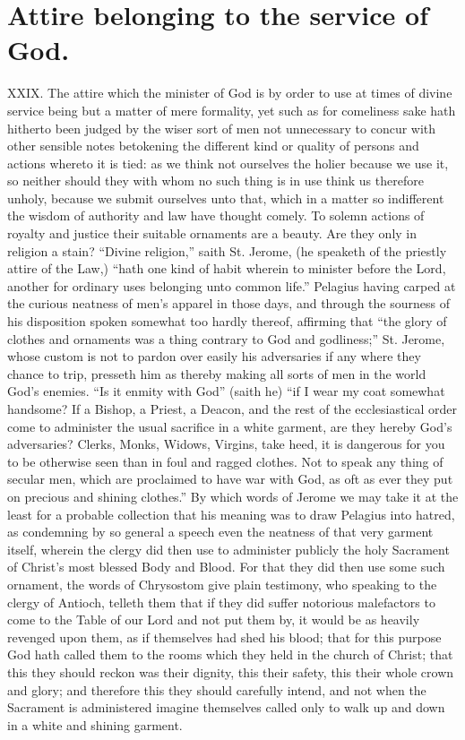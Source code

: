 \section*{Attire belonging to the service of God.}
XXIX. The attire which the minister of God is by order to use at times of divine service being but a matter of mere formality, yet such as for comeliness sake hath hitherto been judged by the wiser sort of men not unnecessary to concur with other sensible notes betokening the different kind or quality of persons and actions whereto it is tied: as we think not ourselves the holier because we use it, so neither should they with whom no such thing is in use think us therefore unholy, because we submit ourselves unto that, which in a matter so  indifferent the wisdom of authority and law have thought comely. To solemn actions of royalty and justice their suitable ornaments are a beauty. Are they only in religion a stain?
“Divine religion,” saith St. Jerome, (he speaketh of the priestly attire of the Law,) “hath one kind of habit wherein to minister before the Lord, another for ordinary uses belonging unto common life.” Pelagius having carped at the curious neatness of men’s apparel in those days, and through the sourness of his disposition spoken somewhat too hardly thereof, affirming that “the glory of clothes and ornaments was a thing contrary to God and godliness;” St. Jerome, whose custom is not to pardon over easily his adversaries if any where they chance to trip, presseth him as thereby making all sorts of men in the world God’s enemies. “Is it enmity with God” (saith he) “if I wear my coat somewhat handsome? If a Bishop, a Priest, a Deacon, and the rest of the ecclesiastical order come to administer the usual sacrifice in a white garment, are they hereby God’s adversaries? Clerks, Monks, Widows, Virgins, take heed, it is dangerous for you to be otherwise seen than in foul and ragged clothes. Not to speak any thing of secular men, which are proclaimed to have war with God, as oft as ever they put on precious and shining clothes.” By which words of Jerome we may take it at the least for a probable collection that his meaning was to draw Pelagius into hatred, as condemning by so general a speech even the neatness of that very garment itself, wherein the clergy did then use to administer publicly the holy Sacrament of Christ’s most blessed Body and Blood. For that they did then use some such ornament, the words of Chrysostom give plain  testimony, who speaking to the clergy of Antioch, telleth them that if they did suffer notorious malefactors to come to the Table of our Lord and not put them by, it would be as heavily revenged upon them, as if themselves had shed his blood; that for this purpose God hath called them to the rooms which they held in the church of Christ; that this they should reckon was their dignity, this their safety, this their whole crown and glory; and therefore this they should carefully intend, and not when the Sacrament is administered imagine themselves called only to walk up and down in a white and shining garment.
